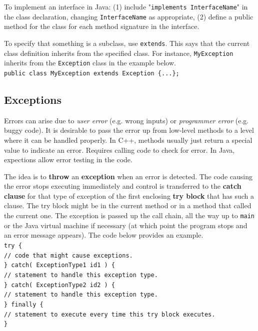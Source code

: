 To implement an interface in Java: (1) include "\texttt{implements InterfaceName}" in the class declaration, changing \texttt{InterfaceName} as appropriate, (2) define a public method for the class for each method signature in the interface. 

To specify that something is a subclass, use \texttt{extends}. This says that the current class definition inherits from the specified class. For instance, \texttt{MyException} inherits from the \texttt{Exception} class in the example below. \\

\texttt{public class MyException extends Exception \{...\};} \\

\subsection{Exceptions}

Errors can arise due to \textit{user error} (e.g. wrong inputs) or \textit{programmer error} (e.g. buggy code). It is desirable to pass the error up from low-level methods to a level where it can be handled properly. In C++, methods usually just return a special value to indicate an error. Requires calling code to check for error. In Java, expections allow error testing in the code. 

The idea is to \textbf{throw} an \textbf{exception} when an error is detected. The code causing the error stops executing immediately and control is transferred to the \textbf{catch clause} for that type of exception of the first enclosing \textbf{try block} that has such a clause. The try block might be in the current method or in a method that called the current one. The exception is passed up the call chain, all the way up to \texttt{main} or the Java virtual machine if necessary (at which point the program stops and an error message appears). The code below provides an example. \\ 

\texttt{try \{} \\
\indent \indent \texttt{// code that might cause exceptions.} \\
\indent \texttt{\} catch( ExceptionType1 id1 ) \{} \\
\indent \indent \texttt{// statement to handle this exception type.} \\
\indent \texttt{\} catch( ExceptionType2 id2 ) \{} \\
\indent \indent \texttt{// statement to handle this exception type.} \\
\indent \texttt{\} finally \{} \\
\indent \indent \texttt{// statement to execute every time this try block executes.} \\
\indent \texttt{\}} \\

